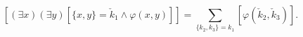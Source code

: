 $$[(\exists x)(\exists y)[\{x, y\} = \check{k}_1 \land \varphi(x, y)]] = \sum_{\{k_2, k_3\} = k_1} [\varphi(\check{k}_2, \check{k}_3)].$$